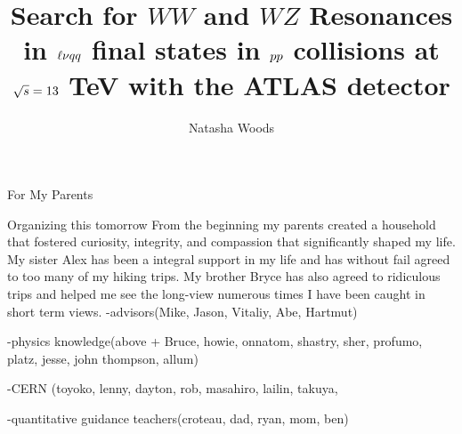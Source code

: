 





\title{Search for $WW$ and $WZ$ Resonances in $\ell\nu \MakeLowercase{qq}$ final states in $\MakeLowercase{pp}$ collisions at $\sqrt{\MakeLowercase{s}}=13$ TeV with the ATLAS detector}
\author{Natasha Woods}
\deanlinethree{}

\begin{frontmatter}
\maketitle

\copyrightpage

\tableofcontents


\listoffigures

\listoftables
\begin{abstract}

\end{abstract}

\begin{dedication}
\vspace*{\fill}
\begin{center}
For My Parents
\end{center}
\vspace*{\fill}
\end{dedication}

\begin{acknowledgements}
Organizing this tomorrow
From the beginning my parents created a household that fostered curiosity, integrity, and compassion that significantly shaped my life. My sister Alex has been a integral support in my life and has without fail agreed to too many of my hiking trips. My brother Bryce has also agreed to ridiculous trips and helped me see the long-view numerous times I have been caught in short term views.
-advisors(Mike, Jason, Vitaliy, Abe, Hartmut)


-physics knowledge(above + Bruce, howie, onnatom, shastry, sher, profumo, platz, jesse, john thompson, allum)


-CERN (toyoko, lenny, dayton, rob, masahiro, lailin, takuya, 


-quantitative guidance teachers(croteau, dad, ryan, mom, ben)



\end{acknowledgements}
\end{frontmatter}
